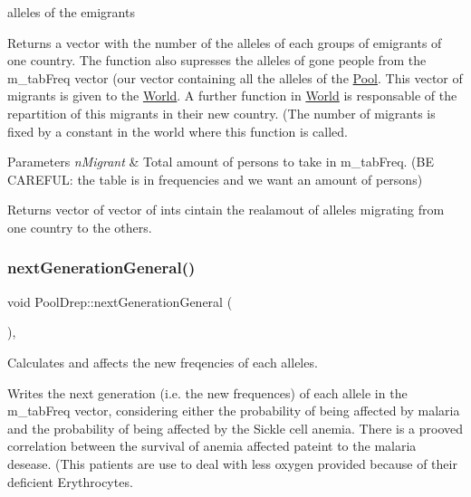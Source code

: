 alleles of the emigrants 

Returns a vector with the number of the alleles of each groups of emigrants of one country. The function also supresses the alleles of gone people from the m\+\_\+tab\+Freq vector (our vector containing all the alleles of the \hyperlink{class_pool}{Pool}. This vector of migrants is given to the \hyperlink{class_world}{World}. A further function in \hyperlink{class_world}{World} is responsable of the repartition of this migrants in their new country. (The number of migrants is fixed by a constant in the world where this function is called. 
\begin{DoxyParams}{Parameters}
{\em n\+Migrant} & Total amount of persons to take in m\+\_\+tab\+Freq. (BE C\+A\+R\+E\+F\+UL\+: the table is in frequencies and we want an amount of persons) \\
\hline
\end{DoxyParams}
\begin{DoxyReturn}{Returns}
vector of vector of ints cintain the realamout of alleles migrating from one country to the others. 
\end{DoxyReturn}
\hypertarget{class_pool_drep_a4fba163580813690fbeb2d4ad0841a86}{}\label{class_pool_drep_a4fba163580813690fbeb2d4ad0841a86} 
\subsubsection{\texorpdfstring{next\+Generation\+General()}{nextGenerationGeneral()}}
{\footnotesize\ttfamily void Pool\+Drep\+::next\+Generation\+General (\begin{DoxyParamCaption}{ }\end{DoxyParamCaption})\hspace{0.3cm}{\ttfamily [override]}, {\ttfamily [virtual]}}



Calculates and affects the new freqencies of each alleles. 

Writes the next generation (i.\+e. the new frequences) of each allele in the m\+\_\+tab\+Freq vector, considering either the probability of being affected by malaria and the probability of being affected by the Sickle cell anemia. There is a prooved correlation between the survival of anemia affected pateint to the malaria desease. (This patients are use to deal with less oxygen provided because of their deficient Erythrocytes. 

